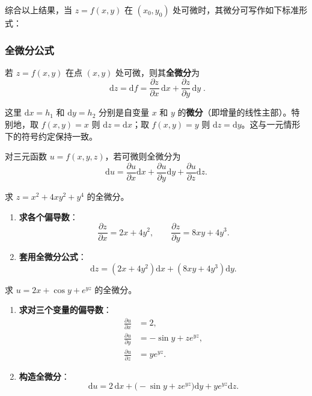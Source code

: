 \documentclass[lang=cn,11pt]{elegantbook}
\begin{document}
综合以上结果，当 $z=f(x,y)$ 在 $(x_0,y_0)$ 处可微时，其微分可写作如下标准形式：

\subsubsection*{全微分公式}

\begin{property} \label{property:total-diff-formula}
若 $z=f(x,y)$ 在点 $(x,y)$ 处可微，则其\textbf{全微分}为
\[
\boxed{\; \mathrm{d}z=\mathrm{d}f=\frac{\partial z}{\partial x}\,\mathrm{d}x+\frac{\partial z}{\partial y}\,\mathrm{d}y\;}.
\]
\end{property}

这里 $\mathrm{d}x=h_1$ 和 $\mathrm{d}y=h_2$ 分别是自变量 $x$ 和 $y$ 的\textbf{微分}（即增量的线性主部）。特别地，取 $f(x,y)=x$ 则 $\mathrm{d}z=\mathrm{d}x$；取 $f(x,y)=y$ 则 $\mathrm{d}z=\mathrm{d}y$。这与一元情形下的符号约定保持一致。

对三元函数 $u=f(x,y,z)$，若可微则全微分为
\[
\mathrm{d}u=\frac{\partial u}{\partial x}\mathrm{d}x+\frac{\partial u}{\partial y}\mathrm{d}y+\frac{\partial u}{\partial z}\mathrm{d}z.
\]

\begin{exercise}[多项式的全微分] \label{ex:total-diff-poly}
求 $z=x^2+4xy^2+y^4$ 的全微分。
\end{exercise}

\begin{solution}
\begin{enumerate}
  \item \textbf{求各个偏导数}：
  \[
  \frac{\partial z}{\partial x}=2x+4y^2,\qquad \frac{\partial z}{\partial y}=8xy+4y^3.
  \]
  \item \textbf{套用全微分公式}：
  \[
  \boxed{\mathrm{d}z=(2x+4y^2)\mathrm{d}x+(8xy+4y^3)\mathrm{d}y}.
  \]

\end{enumerate}
\end{solution}

\begin{exercise}[混合型函数的全微分] \label{ex:total-diff-mixed}
求 $u=2x+\cos y+e^{yz}$ 的全微分。
\end{exercise}

\begin{solution}
\begin{enumerate}
  \item \textbf{求对三个变量的偏导数}：
  \begin{align*}
  \frac{\partial u}{\partial x}&=2,\\
  \frac{\partial u}{\partial y}&=-\sin y+z e^{yz},\\
  \frac{\partial u}{\partial z}&=ye^{yz}.
  \end{align*}
  \item \textbf{构造全微分}：
  \[
  \boxed{\mathrm{d}u=2\,\mathrm{d}x+\bigl(-\sin y+z e^{yz}\bigr)\mathrm{d}y+ye^{yz}\mathrm{d}z}.
  \]

\end{enumerate}
\end{solution}
\end{document}
